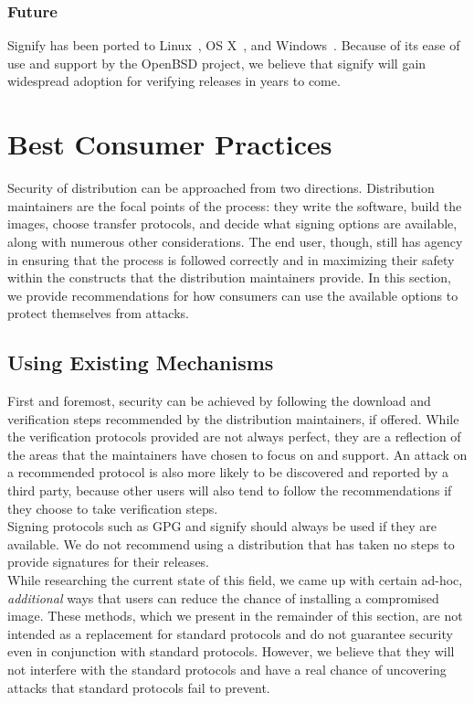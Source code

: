 \documentclass[conference]{IEEEtran}
\begin{document}
\subsubsection{Future}
Signify has been ported to Linux~\cite{signifylinux}, OS X~\cite{signifyosx}, and
Windows~\cite{signifywindows}. Because of its ease of use and support by the OpenBSD project,
we believe that signify will gain widespread adoption for verifying releases in years to come. 

\section{Best Consumer Practices}

Security of distribution can be approached from two directions. Distribution
maintainers are the focal points of the process: they write the software, build the images,
choose transfer protocols, and decide what signing options are available, along with numerous
other considerations. The end user, though, still has agency in ensuring that the process is
followed correctly and in maximizing their safety within the constructs that the distribution
maintainers provide. In this section, we provide recommendations for how consumers can use
the available options to protect themselves from attacks.

\subsection{Using Existing Mechanisms}

First and foremost, security can be achieved by following the download and verification steps
recommended by the distribution maintainers, if offered. While the verification protocols
provided are not always perfect, they are a reflection of the areas that the maintainers have
chosen to focus on and support. An attack on a recommended protocol is also more likely to be
discovered and reported by a third party, because other users will also tend to follow the
recommendations if they choose to take verification steps.\\
\indent Signing protocols such as GPG and signify should always be used if they are
available. We do not recommend using a distribution that has taken no steps to provide
signatures for their releases.\\
\indent While researching the current state of this field, we came up with certain ad-hoc,
\emph{additional} ways that users can reduce the chance of installing a compromised image.
These methods, which we present in the remainder of this section, are not intended as a
replacement for standard protocols and do not guarantee security even in conjunction with
standard protocols. However, we believe that they will not interfere with the standard
protocols and have a real chance of uncovering attacks that standard protocols fail to
prevent.
\end{document}
